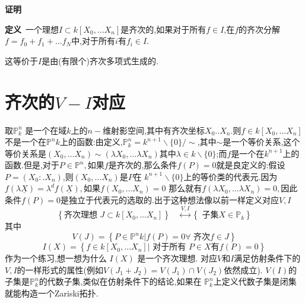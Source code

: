 \documentclass[UTF8]{book}
\begin{document}
		
		\textbf{证明}\ 
		
		
		\textbf{定义}\ 一个理想$I \subset k \left[ X _{0}, \ldots X _{ n }\right]$是齐次的,如果对于所有$f \in I$,在$ f $的齐次分解$f = f _{0}+ f _{1}+\ldots f _{ N }$中,对于所有$ i $有$f _{ i } \in I$.
		
		
		这等价于$ I $是由(有限个)齐次多项式生成的.
		
		
	\section{齐次的$ V-I $对应}
		取$\mathbb{P} ^{n}_{k}$ 是一个在域$ k $上的$ n- $维射影空间,其中有齐次坐标$X _{0} . . X _{ n }$.则$f \in k \left[ X _{0}, \ldots X _{ n }\right]$不是一个在$\mathbb{P} ^{ n } k $上的函数:由定义,$\mathbb{P} ^{ n }_{ k }= k ^{ n +1} \backslash\{0\} / \sim$,其中$\sim$是一个等价关系,这个等价关系是$\left( X _{0}, \ldots X _{ n }\right) \sim\left(\lambda X _{0}, \ldots \lambda X _{ n }\right)$其中$\lambda \in k \backslash\{0\} $;而$ f $是一个在$k ^{n+1}$上的函数.但是,对于$P \in \mathbb{P}^{n} ,$如果$ f $是齐次的,那么条件$f ( P )=0$就是良定义的:假设$P =\left( X _{0}: . X _{ n }\right)$,则$\left(X_{0}, \ldots X_{n}\right)$是$ P $在 $k^{n+1} \backslash\{0\}$上的等价类的代表元.因为$f(\lambda \underline{X})=\lambda^{d} f(\underline{X}),$如果$f\left(X_{0}, \ldots X_{n}\right)=0$ 那么就有$f\left(\lambda X_{0}, \ldots \lambda X_{n}\right)=0,$因此条件$f ( P )=0$是独立于代表元的选取的.出于这种想法像以前一样定义对应$ V,I $
		\begin{equation*}
		\left\{\text {齐次理想 } J \subset k \left[ X _{0}, \dots X _{ n }\right]\right\} \quad \stackrel{ V , I }{\longleftrightarrow}\left\{\text { 子集} X \in \mathbb{P} _{ k }\right\}
		\end{equation*}
		其中
		\begin{equation*}
		V ( J )=\left\{ P \in \mathbb{P} ^{ n } k | f ( P )=0 \forall \text { 齐次} f \in J \right\}
		\end{equation*}
		\begin{equation*}
		I ( X )=\left\{ f \in k \left[ X _{0}, \ldots X _{ n }\right] |  \text { 对于所有 } P \in X \text{有} f ( P )=0\right\}
		\end{equation*}
		作为一个练习,想一想为什么 $I ( X )$ 是一个齐次理想.
		对应$ V $和$ I $满足仿射条件下的$ V,I $的一样形式的属性(例如$V \left( J _{1}+ J _{2}\right)=  V \left( J _{1}\right) \cap V \left( J _{2}\right) $依然成立). $V ( I )$的子集是$\mathbb{P}^{n} _{ k }$的代数子集,类似在仿射条件下的结论,如果在 $\mathbb{P} ^{n}_{k}$上定义代数子集是闭集就能构造一个Zariski拓扑.
		
\end{document}
